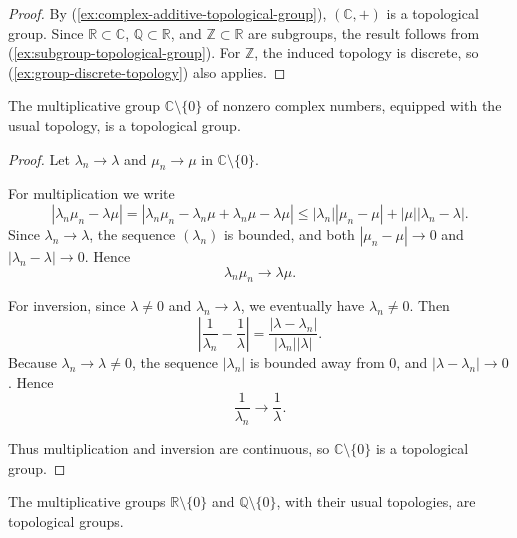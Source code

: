 \begin{proof}
    By (\ref{ex:complex-additive-topological-group}), \( (\mathbb{C},+) \) is a topological group.
    Since \( \mathbb{R} \subset \mathbb{C} \), \( \mathbb{Q} \subset \mathbb{R} \), and \( \mathbb{Z} \subset \mathbb{R} \) are subgroups, the result follows from (\ref{ex:subgroup-topological-group}).
    For \( \mathbb{Z} \), the induced topology is discrete, so (\ref{ex:group-discrete-topology}) also applies.
\end{proof}



\begin{example}
    \label{ex:nonzero-complex-topological-group}

    The multiplicative group \( \mathbb{C}\setminus\{0\} \) of nonzero complex numbers, equipped with the usual topology, is a topological group.
\end{example}

\begin{proof}
    Let \( \lambda_n \to \lambda \) and \( \mu_n \to \mu \) in \( \mathbb{C}\setminus\{0\} \).

    For multiplication we write
    \[
        |\lambda_n\mu_n-\lambda\mu|
        =|\lambda_n\mu_n-\lambda_n\mu+\lambda_n\mu-\lambda\mu|
        \le |\lambda_n||\mu_n-\mu|+|\mu||\lambda_n-\lambda|.
    \]
    Since \( \lambda_n\to\lambda \), the sequence \( (\lambda_n) \) is bounded, and both
    \( |\mu_n-\mu| \to 0 \) and \( |\lambda_n-\lambda| \to 0 \). Hence
    \[
        \lambda_n\mu_n \to \lambda\mu .
    \]

    For inversion, since \( \lambda\neq0 \) and \( \lambda_n\to\lambda \), we eventually have \( \lambda_n\neq0 \). Then
    \[
        \left|\frac{1}{\lambda_n}-\frac{1}{\lambda}\right|
        = \frac{|\lambda-\lambda_n|}{|\lambda_n||\lambda|}.
    \]
    Because \( \lambda_n \to \lambda \neq 0 \), the sequence \( |\lambda_n| \) is bounded away from \(0\), and \( |\lambda-\lambda_n|\to0 \). Hence
    \[
        \frac{1}{\lambda_n} \to \frac{1}{\lambda}.
    \]

    Thus multiplication and inversion are continuous, so \( \mathbb{C}\setminus\{0\} \) is a topological group.
\end{proof}


\begin{example}
    The multiplicative groups \( \mathbb{R}\setminus\{0\} \) and \( \mathbb{Q}\setminus\{0\} \), with their usual topologies, are topological groups.
\end{example}


